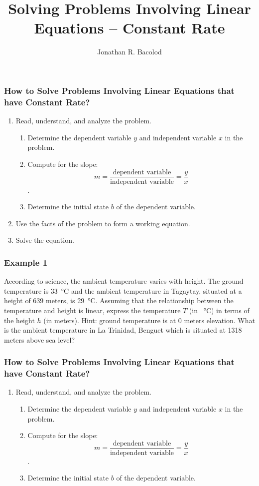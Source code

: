 \documentclass[14pt]{beamer}
\title[] {Solving Problems Involving Linear Equations -- Constant Rate}
\author{Jonathan R. Bacolod}
\institute[SHS]{Sauyo High School}
\date{}
\begin{document}
	\frame{\titlepage}
			
	\begin{frame}
		\frametitle{How to Solve Problems Involving Linear Equations that have Constant Rate?}
		\footnotesize
		\begin{enumerate}  
			\item Read, understand, and analyze the problem. 
			\begin{enumerate}
				\footnotesize
				\item \pause Determine the dependent variable $ y $ and independent variable $ x $ in the problem.
				\item \pause Compute for the slope:  \[ m = \dfrac{\text{dependent variable} }{\text{independent variable}} = \dfrac{y}{x} \] .
				\item \pause Determine the initial state $ b $ of the dependent variable.
			\end{enumerate}
			\item \pause Use the facts of the problem to form a working equation.
			\item \pause Solve the equation.			
		\end{enumerate}  
	\end{frame}

    \begin{frame}
    	\frametitle{Example 1}
    	According to science, the ambient temperature varies with height. The ground
    	temperature is \SI{33}{\celsius} and the ambient temperature in Tagaytay, situated at a height of 639 meters, is \SI{29}{\celsius}. Assuming that the relationship between the temperature and height is linear, express the temperature $ T $ (in \SI{}{\celsius}) in terms of the height $ h $ (in meters). Hint: ground temperature is at 0 meters elevation. What is the ambient temperature in La Trinidad, Benguet which is situated at 1318 meters above sea level?
    \end{frame}

    \begin{frame}
    	\frametitle{How to Solve Problems Involving Linear Equations that have Constant Rate?}
    	\footnotesize
    	\begin{enumerate}  
    		\item Read, understand, and analyze the problem. 
    		\begin{enumerate}
    			\footnotesize
    			\item  Determine the dependent variable $ y $ and independent variable $ x $ in the problem.
    			\item  Compute for the slope:  \[ m = \dfrac{\text{dependent variable} }{\text{independent variable}} = \dfrac{y}{x} \] .
    			\item  Determine the initial state $ b $ of the dependent variable.
    		\end{enumerate}
    	\end{enumerate}  
    \end{frame}
\end{document}

